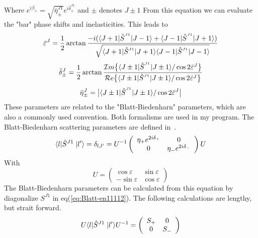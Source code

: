 %
Where $e^{i\beta_\pm}=\sqrt{\bar{\eta}^{J1}_\pm} e^{i\bar{\delta}^{J1}_\pm}$  and  $\pm$ denotes $J\pm1$
From this equation we can evaluate the "bar" phase shifts and inelasticities. This leads to
%
\begin{equation}\label{eq:bar-eps}
\bar{\varepsilon}^J=\inv{2} \arctan\frac{-i({\bra{J+1} \op{S}^{{}^{J1}}\ket{J-1} } +
\bra{J-1} \op{S}^{{}^{J1}}\ket{J+1} )}
{\sqrt{\bra{J+1} \op{S}^{{}^{J1}}\ket{J+1} \bra{J-1} \op{S}^{{}^{J1}}\ket{J-1} }}
\end{equation}
\begin{equation}\label{eq:bar-delta}
\bar{\delta}^J_\pm=\inv{2} \arctan\frac{{\cal I}m\big\{\bra{J\pm 1} \op{S}^{{}^{J1}}\ket{J\pm 1}/
\cos 2\bar{\varepsilon}^J\big\}}
{{\cal R}e\big\{\bra{J\pm 1} \op{S}^{{}^{J1}}\ket{J\pm 1}/\cos 2\bar{\varepsilon}^J\big\}} 
\end{equation}
\begin{equation}\label{eq:bar-inelast}
\bar{\eta}^{J}_\pm=\big|\bra{J\pm 1} \op{S}^{{}^{J1}}\ket{J\pm 1}/\cos 2\bar{\varepsilon}^J\big|
\end{equation}
%
These parameters are related to the "Blatt-Biedenharn" parameters,
which are also a commonly used convention. 
Both formalisms are used in my program.
\nl
The Blatt-Biedenharn scattering parameters are defined in~\cite{Blatt-Biedenhar}.
\begin{equation}\label{eq:Blatt-en11112}
\braketm{{ l}}{\op{S}^{J1}\;}{{ l'}}=\delta_{l,l'}%
=U^{-1}\left(
\begin{array}{cc}
\eta_+e^{2i\delta_+}     &  0\\
0                        &  \eta_-e^{2i\delta_-}
\end{array} \right)U
\end{equation} 
With
\begin{equation}
U=\left(
\begin{array}{cc}
\cos\varepsilon    &  \sin\varepsilon\\
-\sin\varepsilon  &  \cos\varepsilon
\end{array} \right)
\end{equation}
The Blatt-Biedenharn parameters can be calculated from this equation by diagonalize $S^{J1}$ in eq(\ref{eq:Blatt-en11112}).
The following calculations are lengthy, but strait forward.
\begin{equation}
U\langle{ l}|\hat{S}^{J1}\;|{ l'}\rangle U^{-1}=\left(
\begin{array}{cc}
S_+    &  0\\
0 &  S_-
\end{array} \right)
\end{equation}
